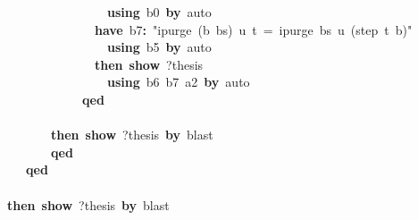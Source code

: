 \documentclass{article}
\newcommand{\syntaxKEYWORDA}[1]{\textcolor[rgb]{0.0,0.4,0.6}{\textbf{#1}}}
\newcommand{\syntaxKEYWORDC}[1]{\textcolor[rgb]{0.0,0.6,1.0}{\textbf{#1}}}
\newcommand{\syntaxLITERALA}[1]{\textcolor[rgb]{1.0,0.0,0.8}{#1}}
\newcommand{\syntaxOPERATOR}[1]{\textcolor[rgb]{0.0,0.0,0.0}{\textbf{#1}}}
\newcommand{\syntaxKEYWORDA}[1]{\textcolor[rgb]{0.0,0.4,0.6}{\textbf{#1}}}
\newcommand{\syntaxKEYWORDC}[1]{\textcolor[rgb]{0.0,0.6,1.0}{\textbf{#1}}}
\newcommand{\syntaxLITERALA}[1]{\textcolor[rgb]{1.0,0.0,0.8}{#1}}
\newcommand{\syntaxOPERATOR}[1]{\textcolor[rgb]{0.0,0.0,0.0}{\textbf{#1}}}
\newcommand{\syntaxKEYWORDA}[1]{\textcolor[rgb]{0.0,0.4,0.6}{\textbf{#1}}}
\newcommand{\syntaxKEYWORDC}[1]{\textcolor[rgb]{0.0,0.6,1.0}{\textbf{#1}}}
\newcommand{\syntaxLITERALA}[1]{\textcolor[rgb]{1.0,0.0,0.8}{#1}}
\newcommand{\syntaxOPERATOR}[1]{\textcolor[rgb]{0.0,0.0,0.0}{\textbf{#1}}}
\newcommand{\syntaxKEYWORDA}[1]{\textcolor[rgb]{0.0,0.4,0.6}{#1}}
\newcommand{\syntaxKEYWORDC}[1]{\textcolor[rgb]{0.0,0.6,1.0}{#1}}
\newcommand{\syntaxLITERALA}[1]{\textcolor[rgb]{1.0,0.0,0.8}{\textbf{#1}}}
\newcommand{\syntaxOPERATOR}[1]{\textcolor[rgb]{0.0,0.0,0.0}{#1}}
\newcommand{\syntaxKEYWORDA}[1]{\textcolor[rgb]{0.0,0.4,0.6}{\textbf{#1}}}
\newcommand{\syntaxKEYWORDC}[1]{\textcolor[rgb]{0.0,0.6,1.0}{\textbf{#1}}}
\newcommand{\syntaxLITERALA}[1]{\textcolor[rgb]{1.0,0.0,0.8}{#1}}
\newcommand{\syntaxOPERATOR}[1]{\textcolor[rgb]{0.0,0.0,0.0}{\textbf{#1}}}
\newcommand{\syntaxKEYWORDA}[1]{\textcolor[rgb]{0.0,0.4,0.6}{\textbf{#1}}}
\newcommand{\syntaxKEYWORDC}[1]{\textcolor[rgb]{0.0,0.6,1.0}{\textbf{#1}}}
\newcommand{\syntaxLITERALA}[1]{\textcolor[rgb]{1.0,0.0,0.8}{#1}}
\newcommand{\syntaxOPERATOR}[1]{\textcolor[rgb]{0.0,0.0,0.0}{\textbf{#1}}}
\begin{document}
{\ }{\ }{\ }{\ }{\ }{\ }{\ }{\ }{\ }{\ }{\ }{\ }{\ }{\ }{\ }{\ }{\ }{\ }{\ }{\ }{\ }{\ }{\ }\syntaxKEYWORDA{using}{\ }b0{\ }\syntaxKEYWORDA{by}{\ }auto\hspace*{\fill}\\
{\ }{\ }{\ }{\ }{\ }{\ }{\ }{\ }{\ }{\ }{\ }{\ }{\ }{\ }{\ }{\ }{\ }{\ }{\ }{\ }{\ }\syntaxKEYWORDA{have}{\ }b7\syntaxOPERATOR{:}{\ }\syntaxLITERALA{"ipurge{\ }(b{\ }\usebox{\hashbox}{\ }bs){\ }u{\ }t{\ }={\ }ipurge{\ }bs{\ }u{\ }(step{\ }t{\ }b)"}\hspace*{\fill}\\
{\ }{\ }{\ }{\ }{\ }{\ }{\ }{\ }{\ }{\ }{\ }{\ }{\ }{\ }{\ }{\ }{\ }{\ }{\ }{\ }{\ }{\ }{\ }\syntaxKEYWORDA{using}{\ }b5{\ }\syntaxKEYWORDA{by}{\ }auto\hspace*{\fill}\\
{\ }{\ }{\ }{\ }{\ }{\ }{\ }{\ }{\ }{\ }{\ }{\ }{\ }{\ }{\ }{\ }{\ }{\ }{\ }{\ }{\ }\syntaxKEYWORDA{then}{\ }\syntaxKEYWORDC{show}{\ }?thesis\hspace*{\fill}\\
{\ }{\ }{\ }{\ }{\ }{\ }{\ }{\ }{\ }{\ }{\ }{\ }{\ }{\ }{\ }{\ }{\ }{\ }{\ }{\ }{\ }{\ }{\ }\syntaxKEYWORDA{using}{\ }b6{\ }b7{\ }a2{\ }\syntaxKEYWORDA{by}{\ }auto{\ }\hspace*{\fill}\\
{\ }{\ }{\ }{\ }{\ }{\ }{\ }{\ }{\ }{\ }{\ }{\ }{\ }{\ }{\ }{\ }{\ }{\ }{\ }\syntaxKEYWORDA{qed}\hspace*{\fill}\\
{\ }{\ }{\ }{\ }{\ }{\ }{\ }{\ }{\ }{\ }{\ }{\ }{\ }{\ }\syntaxKEYWORDA{\usebox{\closecurlybracket}}\hspace*{\fill}\\
{\ }{\ }{\ }{\ }{\ }{\ }{\ }{\ }{\ }{\ }{\ }{\ }{\ }{\ }\syntaxKEYWORDA{then}{\ }\syntaxKEYWORDC{show}{\ }?thesis{\ }\syntaxKEYWORDA{by}{\ }blast\hspace*{\fill}\\
{\ }{\ }{\ }{\ }{\ }{\ }{\ }{\ }{\ }{\ }{\ }{\ }{\ }{\ }\syntaxKEYWORDA{qed}\hspace*{\fill}\\
{\ }{\ }{\ }{\ }{\ }{\ }{\ }{\ }{\ }{\ }\syntaxKEYWORDA{qed}\hspace*{\fill}\\
{\ }{\ }{\ }{\ }{\ }{\ }{\ }\syntaxKEYWORDA{\usebox{\closecurlybracket}}\hspace*{\fill}\\
{\ }{\ }{\ }{\ }{\ }{\ }{\ }\syntaxKEYWORDA{then}{\ }\syntaxKEYWORDC{show}{\ }?thesis{\ }\syntaxKEYWORDA{by}{\ }blast\hspace*{\fill}\\
\end{document}
